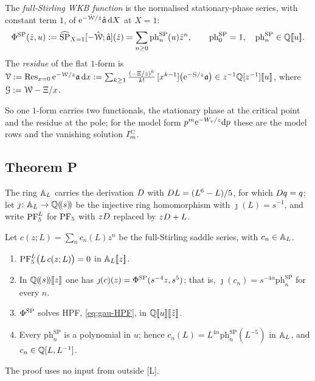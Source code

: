 \begin{defn}
\label{def:con-PhiSP}
The \emph{full-Stirling WKB function} is the normalised stationary-phase series, with constant term $1$, of $\mathrm{e}^{-\hat{\mathcal{W}}/\hat{z}}\hat{\mathfrak{a}}\,\mathrm{d} X$ at $X=1$:
\[
\Phi^{\mathrm{SP}}(\hat{z},u):=\widehat{\mathrm{SP}}_{X=1}[-\hat{\mathcal{W}};\hat{\mathfrak{a}}](\hat{z})=\sum_{n\geq0}\mathrm{ph}^{\mathrm{SP}}_n(u)\hat{z}^n,\qquad\mathrm{ph}^{\mathrm{SP}}_0=1,\quad\mathrm{ph}^{\mathrm{SP}}_n\in\mathbb{Q}[\![ u ]\!] .
\]
The \emph{residue} of the flat $1$-form is $\mathcal{V}:=\operatorname*{Res}_{x=0}\mathrm{e}^{-\mathcal{W}/z}\mathfrak{a}\,\mathrm{d} x:=\sum_{k\geq1}\frac{(-\Xi/z)^k}{k!}\,[x^{k-1}]\bigl(\mathrm{e}^{-\mathcal{G}/z}\mathfrak{a}\bigr)\in z^{-1}\mathbb{Q}[z^{-1}][\![ u ]\!]$, where $\mathcal{G}:=\mathcal{W}-\Xi/x$.
\end{defn}

So one $1$-form carries two functionals, the stationary phase at the critical point and the residue at the pole; for the model form $p^m\mathrm{e}^{-W_{v}/z}\mathrm{d} p$ these are the model rows and the vanishing solution $I^{\mathrm{C}}_m$.

\subsection{Theorem P}
\label{sec:con-P}

The ring $\mathbb{A}_{L}$ carries the derivation $D$ with $D L=(L^6-L)/5$, for which $D q=q$; let $\jmath\colon\mathbb{A}_{L}\to\mathbb{Q}(\!(s)\!)$ be the injective ring homomorphism with $\jmath(L)=s^{-1}$, and write $\mathrm{PF}_{5}^L$ for $\mathrm{PF}_{5}$ with $zD$ replaced by $zD+L$.

\begin{thm}
\label{thm:con-Pa}
Let $c(z;L)=\sum_nc_n(L)z^n$ be the full-Stirling saddle series, with $c_n\in\mathbb{A}_{L}$.
\begin{enumerate}
\item $\mathrm{PF}_{5}^{L}\bigl(L\,c(z;L)\bigr)=0$ in $\mathbb{A}_{L}[\![ z ]\!]$.
\item In $\mathbb{Q}(\!(s)\!)[\![ z ]\!]$ one has $\jmath(c)(z)=\Phi^{\mathrm{SP}}(s^{-4}z,s^5)$; that is, $\jmath(c_n)=s^{-4n}\mathrm{ph}^{\mathrm{SP}}_n$ for every $n$.
\item $\Phi^{\mathrm{SP}}$ solves HPF, \eqref{eq:gau-HPF}, in $\mathbb{Q}[\![ u ]\!][\![ \hat{z} ]\!]$.
\item Every $\mathrm{ph}^{\mathrm{SP}}_n$ is a polynomial in $u$; hence $c_n(L)=L^{4n}\mathrm{ph}^{\mathrm{SP}}_n(L^{-5})$ in $\mathbb{A}_{L}$, and $c_n\in\mathbb{Q}[L,L^{-1}]$.
\end{enumerate}
The proof uses no input from outside [L].
\end{thm}

